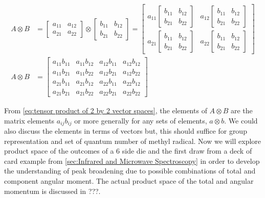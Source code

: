 \documentclass[11pt,a4paper]{book}
\begin{document}
		\begin{equation}
		\label{eq:tensor product of 2 by 2 vector spaces}
			\begin{split}
				A \otimes B &=
				\begin{bmatrix}
					a_{11} & a_{12}\\
					a_{21} & a_{22}
				\end{bmatrix}
				\otimes
				\begin{bmatrix}
					b_{11} & b_{12}\\
					b_{21} & b_{22}
				\end{bmatrix}
				=
				\begin{bmatrix}
					a_{11}	
					\begin{bmatrix}
						b_{11} & b_{12}\\
						b_{21} & b_{22}
					\end{bmatrix} & 
					a_{12}
					\begin{bmatrix}
						b_{11} & b_{12}\\
						b_{21} & b_{22}
					\end{bmatrix}\\
					a_{21} 				
					\begin{bmatrix}
						b_{11} & b_{12}\\
						b_{21} & b_{22}
					\end{bmatrix}
					& a_{22}
					\begin{bmatrix}
						b_{11} & b_{12}\\
						b_{21} & b_{22}
					\end{bmatrix}
				\end{bmatrix}\\
	A \otimes B &=
				\begin{bmatrix}
				a_{11}b_{11} & a_{11}b_{12} & a_{12}b_{11} & a_{12}b_{12}  \\
				a_{11}b_{21} & a_{11}b_{22} & a_{12}b_{21} & a_{12}b_{22}  \\
				a_{21}b_{11} & a_{21}b_{12} & a_{22}b_{11} & a_{22}b_{12} \\
				a_{21}b_{21} & a_{21}b_{22} & a_{22}b_{21} & a_{22}b_{22} 
				\end{bmatrix}
			\end{split}
		\end{equation}
		
		From \autoref{eq:tensor product of 2 by 2 vector spaces}, the elements of $A \otimes B$ are the matrix elements $a_{ij}b_{ij}$ or more generally for any sets of elements, $a \otimes b$. We could also discuss the elements in terms of vectors but, this should suffice for group representation and set of quantum number of methyl radical. Now we will explore product space of the outcomes of a 6 side die and the first draw from a deck of card example from \autoref{sec:Infrared and Microwave Spectroscopy} in order to develop the understanding of peak broadening due to possible combinations of total and component angular moment. The actual product space of the total and angular momentum is discussed in ???.
		
\end{document}
